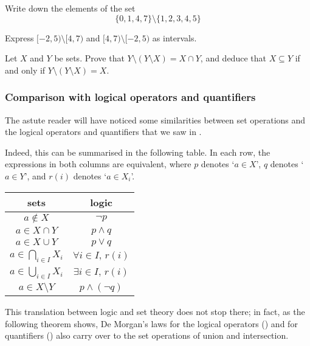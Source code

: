 \begin{exercise}
Write down the elements of the set
\[ \{ 0, 1, 4, 7 \} \setminus \{ 1, 2, 3, 4, 5 \} \]
\end{exercise}

\begin{exercise}
Express $[-2,5) \setminus [4,7)$ and $[4,7) \setminus [-2,5)$ as intervals.
\end{exercise}

\begin{exercise}
\label{exSetMinusSetMinus}
Let $X$ and $Y$ be sets. Prove that $Y \setminus (Y \setminus X)= X \cap Y$, and deduce that $X \subseteq Y$ if and only if $Y \setminus (Y \setminus X) = X$.
\end{exercise}

\subsubsection*{Comparison with logical operators and quantifiers}

The astute reader will have noticed some similarities between set operations and the logical operators and quantifiers that we saw in .

Indeed, this can be summarised in the following table. In each row, the expressions in both columns are equivalent, where $p$ denotes `$a \in X$', $q$ denotes `$a \in Y$', and $r(i)$ denotes `$a \in X_i$'.

\begin{center}\begin{tabular}{c|c}
sets & logic \\ \hline
$a \not\in X$ & $\neg p$ \\
$a \in X \cap Y$ & $p \wedge q$ \\
$a \in X \cup Y$ & $p \vee q$ \\
$a \in \bigcap_{i \in I} X_i$ & $\forall i \in I,\, r(i)$ \\
$a \in \bigcup_{i \in I} X_i$ & $\exists i \in I,\, r(i)$ \\
$a \in X \setminus Y$ & $p \wedge (\neg q)$
\end{tabular}\end{center}

This translation between logic and set theory does not stop there; in fact, as the following theorem shows, De Morgan's laws for the logical operators () and for quantifiers () also carry over to the set operations of union and intersection.

